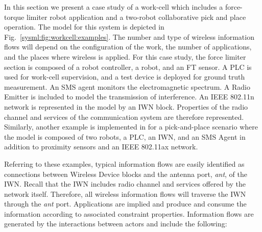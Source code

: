 In this section we present a case study of a work-cell which includes a force-torque limiter robot application and a two-robot collaborative pick and place operation.  The model for this system is depicted in Fig.~\ref{sysml:fig:workcell:examples}.  The number and type of wireless information flows will depend on the configuration of the work, the number of applications, and the places where wireless is applied. For this case study, the force limiter section is composed of a robot controller, a robot, and an FT sensor. A PLC is used for work-cell supervision, and a test device is deployed for ground truth measurement.  An SMS agent monitors the electromagnetic spectrum.  A Radio Emitter is included to model the transmission of interference.  An IEEE 802.11n network is represented in the model by an IWN block. Properties of the radio channel and services of the communication system are therefore represented. Similarly, another example is implemented in \cite{SysML.Candell2018} for a pick-and-place scenario where the model is composed of two robots, a PLC, an IWN, and an SMS Agent in addition to proximity sensors and an IEEE 802.11ax network.

Referring to these examples, typical information flows are easily identified as connections between Wireless Device blocks and the antenna port, \textit{ant}, of the IWN.  Recall that the IWN includes radio channel and services offered by the network itself.  Therefore, all wireless information flows will traverse the IWN through the \textit{ant} port.  Applications are implied and produce and consume the information according to associated constraint properties.  Information flows are generated by the interactions between actors and include the following:  

